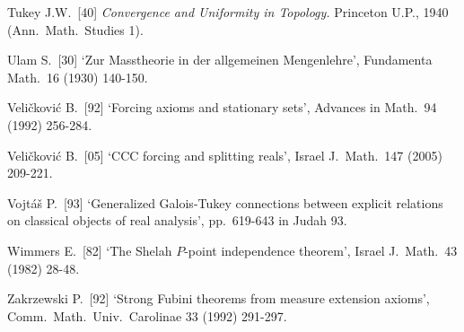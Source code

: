 {Tukey J.W.\ [40] {\it Convergence and Uniformity in Topology.}
Princeton U.P., 1940 (Ann.\ Math.\ Studies 1).
\cmmnt{[513F, \S513 {\it notes}.]}

\medskip

Ulam S.\ [30] `Zur Masstheorie in der allgemeinen
Mengenlehre', Fundamenta Math.\ 16 (1930) 140-150.

\medskip

Veli\v{c}kovi\'c B.\ [92] `Forcing axioms and stationary sets', Advances in
Math.\ 94 (1992) 256-284.
\cmmnt{[517O.]}

Veli\v{c}kovi\'c B.\ [05] `CCC forcing and splitting reals',
Israel J.\ Math.\ 147 (2005) 209-221.
\cmmnt{[\S539 {\it intro.}, 539E, 539N.]}

Vojt\'a\v{s} P.\ [93] `Generalized Galois-Tukey connections between
explicit relations on classical objects of real analysis', pp.\ 619-643
in {\smc Judah 93}.
\cmmnt{[512A.]}

\medskip

Wimmers E.\ [82] `The Shelah $P$-point independence theorem',
Israel J.\ Math.\ 43 (1982) 28-48.
\cmmnt{[\S538 {\it notes\/}.]}

\medskip%

Zakrzewski P.\ [92] `Strong Fubini theorems from measure extension
axioms', Comm.\ Math.\ Univ.\ Carolinae 33 (1992) 291-297.
\cmmnt{[544J.]}



\discrpage

}%
